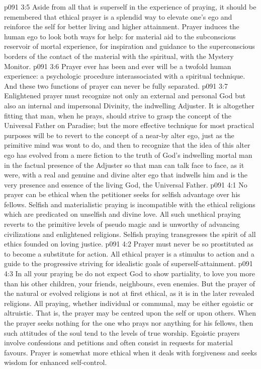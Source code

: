\vs p091 3:5 Aside from all that is superself in the experience of praying, it should be remembered that ethical prayer is a splendid way to elevate one’s ego and reinforce the self for better living and higher attainment. Prayer induces the human ego to look both ways for help: for material aid to the subconscious reservoir of mortal experience, for inspiration and guidance to the superconscious borders of the contact of the material with the spiritual, with the Mystery Monitor.
\vs p091 3:6 Prayer ever has been and ever will be a twofold human experience: a psychologic procedure interassociated with a spiritual technique. And these two functions of prayer can never be fully separated.
\vs p091 3:7 Enlightened prayer must recognize not only an external and personal God but also an internal and impersonal Divinity, the indwelling Adjuster. It is altogether fitting that man, when he prays, should strive to grasp the concept of the Universal Father on Paradise; but the more effective technique for most practical purposes will be to revert to the concept of a near\hyp{}by alter ego, just as the primitive mind was wont to do, and then to recognize that the idea of this alter ego has evolved from a mere fiction to the truth of God’s indwelling mortal man in the factual presence of the Adjuster so that man can talk face to face, as it were, with a real and genuine and divine alter ego that indwells him and is the very presence and essence of the living God, the Universal Father.
\vs p091 4:1 No prayer can be ethical when the petitioner seeks for selfish advantage over his fellows. Selfish and materialistic praying is incompatible with the ethical religions which are predicated on unselfish and divine love. All such unethical praying reverts to the primitive levels of pseudo magic and is unworthy of advancing civilizations and enlightened religions. Selfish praying transgresses the spirit of all ethics founded on loving justice.
\vs p091 4:2 Prayer must never be so prostituted as to become a substitute for action. All ethical prayer is a stimulus to action and a guide to the progressive striving for idealistic goals of superself\hyp{}attainment.
\vs p091 4:3 In all your praying be  do not expect God to show partiality, to love you more than his other children, your friends, neighbours, even enemies. But the prayer of the natural or evolved religions is not at first ethical, as it is in the later revealed religions. All praying, whether individual or communal, may be either egoistic or altruistic. That is, the prayer may be centred upon the self or upon others. When the prayer seeks nothing for the one who prays nor anything for his fellows, then such attitudes of the soul tend to the levels of true worship. Egoistic prayers involve confessions and petitions and often consist in requests for material favours. Prayer is somewhat more ethical when it deals with forgiveness and seeks wisdom for enhanced self\hyp{}control.
